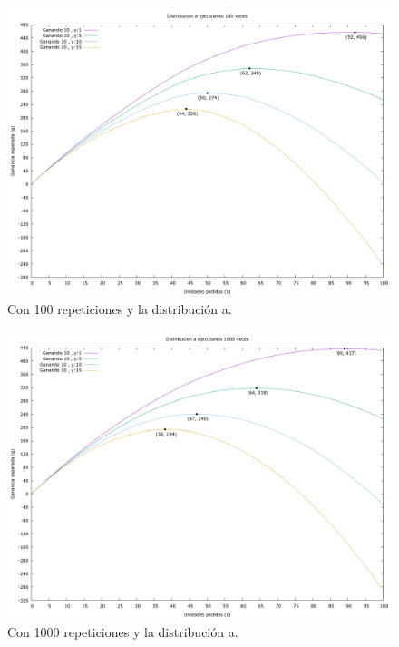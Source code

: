 \documentclass[12pt, spanish]{article}
\begin{document}
\begin{figure}[H]
	\centering
	\includegraphics[scale = 0.3]{prob_a/datos_a_100.png}
	\caption{Con 100 repeticiones y la distribución a.}
	\label{fig:ej1_a_100}

\end{figure}

\begin{figure}[H]
	\centering
	\includegraphics[scale = 0.3]{prob_a/datos_a_1000.png}
	\caption{Con 1000 repeticiones y la distribución a.}
	\label{fig:ej1_a_1000}

\end{figure}
\end{document}
